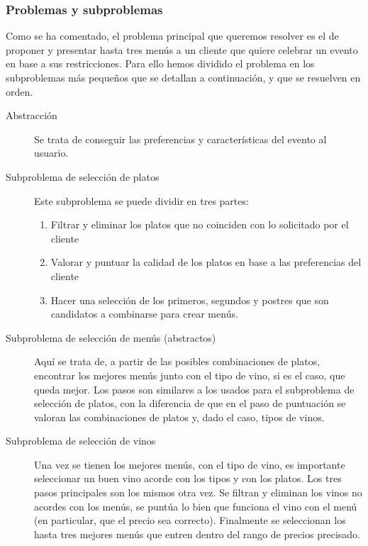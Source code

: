 \subsubsection{Problemas y subproblemas}
Como se ha comentado, el problema principal que queremos resolver es el de
proponer y presentar hasta tres menús a un cliente que quiere celebrar un
evento en base a sus restricciones. Para ello hemos dividido el problema en los
subproblemas más pequeños que se detallan a continuación, y que se resuelven en
orden.

\begin{description}
  \item[Abstracción] Se trata de conseguir las preferencias y características
    del evento al usuario.
  \item[Subproblema de selección de platos] Este subproblema se puede dividir
    en tres partes:
    \begin{enumerate}
      \item Filtrar y eliminar los platos que no coinciden con lo solicitado
        por el cliente        
      \item Valorar y puntuar la calidad de los platos en base a las
        preferencias del cliente
      \item Hacer una selección de los primeros, segundos y postres que son
        candidatos a combinarse para crear menús.
    \end{enumerate}
  \item[Subproblema de selección de menús (abstractos)] Aquí se trata de, a
    partir de las posibles combinaciones de platos, encontrar los mejores menús
    junto con el tipo de vino, si es el caso, que queda mejor. Los pasos son
    similares a los usados para el subproblema de selección de platos, con la
    diferencia de que en el paso de puntuación se valoran las combinaciones de
    platos y, dado el caso, tipos de vinos.
  \item[Subproblema de selección de vinos] Una vez se tienen los mejores menús,
    con el tipo de vino, es importante seleccionar un buen vino acorde con los
    tipos y con los platos. Los tres pasos principales son los mismos otra
    vez. Se filtran y eliminan los vinos no acordes con los menús, se puntúa lo
    bien que funciona el vino con el menú (en particular, que el precio sea
    correcto). Finalmente se seleccionan los hasta tres mejores menús que
    entren dentro del rango de precios precisado.
\end{description}
